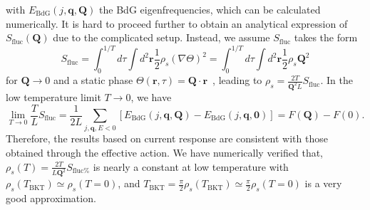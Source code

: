 \documentclass[twocolumn,english,prl,floatfix,citeautoscript,nofootinbib]{revtex4}
\begin{document}
\begin{widetext}
with $E_{\text{BdG}}(j,\mathbf{q,Q})$ the BdG eigenfrequencies, which can be calculated numerically.
It is hard to proceed further to obtain an analytical
expression of $S_{\text{fluc}} (\mathbf{Q})$ due to the complicated setup.
Instead, we
assume  $S_{\text{fluc}}$ takes the form
\begin{equation}
S_{\text{fluc}%
}=\int_{0}^{1/T}d\tau \int d^{2}\mathbf{r}\frac{1}{2}\rho _{s}(\nabla\Theta)^{2}=\int_{0}^{1/T}d\tau \int d^{2}\mathbf{r}\frac{1}{2}\rho _{s}\mathbf{Q}^{2}
\end{equation}
for $\mathbf{Q}\rightarrow 0$ and a static phase $\Theta (\mathbf{r},\tau)=%
\mathbf{Q}\cdot \mathbf{r}$~\cite{PhysRevLett.109.105302S,PhysRevLett.114.110401S},
leading to $\rho _{s}=\frac{2T}{
\mathbf{Q}^{2}L}S_{\text{fluc}}$.
In the low temperature limit $T\rightarrow 0
$, we have
\begin{equation}\lim_{T\rightarrow 0}\frac{T}{L}S_{\text{fluc}}=\frac{1}{2L}\sum_{j,\mathbf{q}%
,E<0}[E_{\text{BdG}}(j,\mathbf{q,Q})-E_{\text{BdG}}(j,\mathbf{q,0})]=F(%
\mathbf{Q})-F(0).\end{equation}
Therefore, the results based on current response are
consistent with those obtained through the effective action. We have
numerically verified that, $\rho _{s}(T)=\frac{2T}{L\mathbf{Q}^{2}}S_{\text{fluc%
}}$ is nearly a constant at low temperature with $\rho _{s}(T_{\text{BKT}})\simeq\rho _{s}(T=0)$,
and $T_{\text{BKT}}=%
\frac{\pi }{2}\rho _{s}(T_{\text{BKT}})\simeq \frac{\pi }{2}\rho _{s}(T=0)$
is a very good approximation.



\end{widetext}
\end{document}

